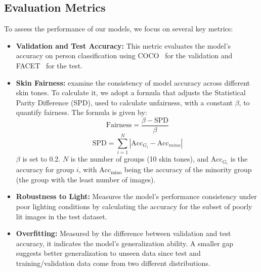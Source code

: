 \subsection{Evaluation Metrics}
To assess the performance of our models, we focus on several key metrics: 
\begin{itemize}[leftmargin=*]
    \item \textbf{Validation and Test Accuracy:} This metric evaluates the model's accuracy on person classification using COCO~\cite{lin2014microsoft} for the validation and FACET~\cite{lin2014microsoft} for the test.
    \item \textbf{Skin Fairness:} examine the consistency of model accuracy across different skin tones. To calculate it, we adopt a formula that adjusts the Statistical Parity Difference (SPD)\cite{sheng2022larger}, used to calculate unfairness, with a constant $\beta$, to quantify fairness. The formula is given by:
%
     \begin{equation}
    \text{Fairness} = \frac{\beta - \text{SPD}}{\beta}
    \end{equation}
%
    \begin{equation}
    \text{SPD} = \sum_{i=1}^{N} \left| \text{Acc}_{G_i} -
    \text{Acc}_{mino} 
    \right|
    \label{eq:spd}
\end{equation}
%
%    
    $\beta$ is set to 0.2. $N$ is the number of groups (10 skin tones), and $\text{Acc}_{G_i}$ is the accuracy for group $i$, with $\text{Acc}_{\text{mino}}$ being the accuracy of the minority group (the group with the least number of images).%
    \item \textbf{Robustness to Light:} Measures the model's performance consistency under poor lighting conditions by calculating the accuracy for the subset of poorly lit images in the test dataset.%
\item \textbf{Overfitting:} Measured by the difference between validation and test accuracy, it indicates the model's generalization ability. A smaller gap suggests better generalization to unseen data since test and training/validation data come from two different distributions.
\end{itemize}
